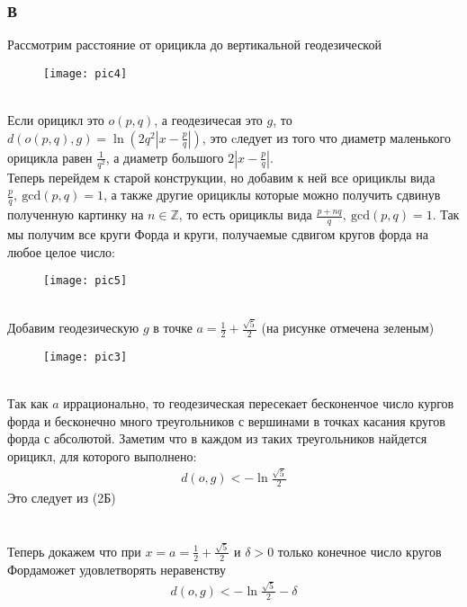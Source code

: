 		\subsubsection*{\textbf{В}}
		Рассмотрим расстояние от орицикла до вертикальной геодезической\\
		\begin{figure}[h]
			\texttt{[image: pic4]}
		\end{figure}\\
		\noindent
		Если орицикл это $o(p,q)$, а геодезичесая это $g$, то $d(o(p,q), g) = \ln(2q^2 |x - \frac{p}{q}|)$, это cледует из того что диаметр маленького орицикла равен $\frac{1}{q^2}$, а диаметр большого $2|x - \frac{p}{q}|$.\\
		Теперь перейдем к старой конструкции, но добавим к ней все орициклы вида $\frac{p}{q},\ \text{gcd}(p,q) = 1$, а также другие орициклы которые можно получить сдвинув полученную картинку на $n \in \mathbb{Z}$, то есть орициклы вида $\frac{p+nq}{q},\ \text{gcd}(p,q) = 1$. Так мы получим все круги Форда и круги, получаемые сдвигом кругов форда на любое целое число:\\
		\begin{figure}[h]
			\texttt{[image: pic5]}
		\end{figure}\\
		\noindent 
		Добавим геодезическую $g$ в точке $a = \frac{1}{2} + \frac{\sqrt{5}}{2}$ (на рисунке отмечена зеленым)\\
		\begin{figure}[h]
			\texttt{[image: pic3]}
		\end{figure}\\
		\noindent 
		Так как $a$ иррационально, то геодезическая пересекает бесконенчое число кургов форда и бесконечно много треугольников с вершинами в точках касания кругов форда с абсолютой. Заметим что в каждом из таких треугольников найдется орицикл, для которого выполнено:
		\begin{gather*}
			d(o, g) < -\ln\frac{\sqrt{5}}{2}
		\end{gather*}
		Это следует из (2Б)\\
		\\
		\\
		Теперь докажем что при $x = a = \frac{1}{2} + \frac{\sqrt{5}}{2}$ и $\delta > 0$ только конечное число кругов Фордаможет удовлетворять неравенству
		\begin{gather*}
			d(o, g) < -\ln\frac{\sqrt{5}}{2} - \delta
		\end{gather*}
